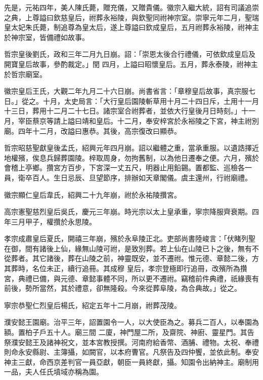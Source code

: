 \begin{pinyinscope}
 先是，元祐四年，美人陳氏薨，贈充儀，又贈貴儀。徽宗入繼大統，詔有司議追崇之典，上尊謚曰欽慈皇后，祔葬永裕陵，與欽聖同祔神宗室。崇寧元年二月，聖瑞皇太妃朱氏薨，制追尊為皇太后，遂上尊謚曰欽成皇后，五月祔葬永裕陵，祔神主於神宗室，皆備禮如故事。



 哲宗皇後劉氏，政和三年二月九日崩。詔：「崇恩太後合行禮儀，可依欽成皇后及開寶皇后故事，參酌裁定。」閏
 四月，上謚曰昭懷皇后。五月，葬永泰陵，祔神主於哲宗廟室。



 徽宗皇后王氏，大觀二年九月二十六日崩。尚書省言：「章穆皇后故事，真宗服七日。」從之。十月，太史局言：「大行皇后園陵斬草用十月二十四日斥，土用十一月十三日，葬用十二月二十七日。諸宗室合祔葬者，並依大行皇後月日時刻。」十一月，宰臣蔡京等請上謚曰靖和皇后。十二月，奉安梓宮於永裕陵之下宮，神主祔別廟。四年十二月，改謚曰惠恭。其後，高宗復改曰顯恭。



 哲宗昭慈聖獻皇後孟氏，紹興元年四月崩。詔以繼體之重，當承重服。以遺誥擇近地權殯，俟息兵歸葬園陵。梓取周身，勿拘舊制，以為他日遷奉之便。六月，殯於會稽上亭鄉。攢宮方百步，下宮深一丈五尺，明器止用鉛錫。置都監、巡檢各一員，衛卒百人。生日忌辰、旦望節序，排辦如天章閣儀。虞主還州，行祔廟禮。



 徽宗顯仁皇后韋氏，紹興二十九年崩，祔於永祐陵攢宮。



 高宗憲聖慈烈皇后吳氏，慶元三年崩。時光宗以太上皇承重，寧宗降服齊衰期。四年三月甲子，權攢於永思陵。



 孝宗成肅皇后夏氏，開禧三年崩，殯於永阜陵正北。吏部尚書陸峻言：「伏睹列聖在御，間有諸後上仙，緣無山陵可祔，是致別葬。若上仙在山陵已卜之後，無有不從葬者。其它諸後，葬在山陵之前，神靈既安，並不遷祔。惟元德、章懿二後，方其葬時，名位未正，續行追冊。其成穆
 皇后，孝宗登極即行追冊，改殯所為攢宮，典禮已備，與元德、章懿事體不同，所以更不遷祔。竊稽前件典禮，祇緣喪有前後，勢所當然，其於禮意，卻無隆殺。今來從葬阜陵，為合典故。」從之。



 寧宗恭聖仁烈皇后楊氏，紹定五年十二月崩，祔葬茂陵。



 濮安懿王園廟。治平三年，詔置園令一人，以大使臣為之。募兵二百人，以奉園為額。置柏子戶五十人。廟三間
 二廈，神門屋二所，及齋院、神廚、靈星門。其告祭濮安懿王及諸神祝文，並本宮教授撰。河南府給香幣、酒脯、禮物。太祝、奉禮則命永安縣尉、主簿攝，如闕官，以本府曹官。凡祭告及四仲饗，並依此制。奉安神主三獻，命西京差判官一員亞獻，朝臣一員終獻，攝。知園令出納神主。廟制用一品，夫人任氏墳域亦稱為園。




\end{pinyinscope}
